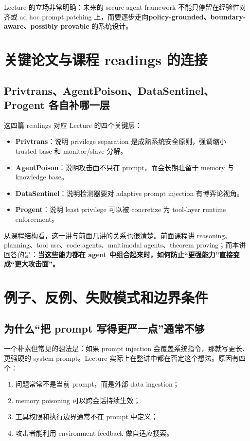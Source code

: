 Lecture 的立场非常明确：未来的 secure agent framework 不能只停留在经验性对齐或 ad hoc prompt patching 上，而要逐步走向\textbf{policy-grounded、boundary-aware、possibly provable} 的系统设计。

\section{关键论文与课程 readings 的连接}

\subsection{Privtrans、AgentPoison、DataSentinel、Progent 各自补哪一层}

这四篇 readings 对应 Lecture 的四个关键层：

\begin{itemize}
\item \textbf{Privtrans}：说明 privilege separation 是成熟系统安全原则，强调缩小 trusted base 和 monitor/slave 分解。
\item \textbf{AgentPoison}：说明攻击面不只在 prompt，而会长期驻留于 memory 与 knowledge base。
\item \textbf{DataSentinel}：说明检测器要对 adaptive prompt injection 有博弈论视角。
\item \textbf{Progent}：说明 least privilege 可以被 concretize 为 tool-layer runtime enforcement。
\end{itemize}

从课程结构看，这一讲与前面几讲的关系也很清楚。前面课程讲 reasoning、planning、tool use、code agents、multimodal agents、theorem proving；而本讲回答的是：\textbf{当这些能力都在 agent 中组合起来时，如何防止“更强能力”直接变成“更大攻击面”。}

\section{例子、反例、失败模式和边界条件}

\subsection{为什么“把 prompt 写得更严一点”通常不够}

一个朴素但常见的想法是：如果 prompt injection 会覆盖系统指令，那就写更长、更强硬的 system prompt。Lecture 实际上在整讲中都在否定这个想法。原因有四个：

\begin{enumerate}
\item 问题常常不是当前 prompt，而是外部 data ingestion；
\item memory poisoning 可以跨会话持续生效；
\item 工具权限和执行边界通常不在 prompt 中定义；
\item 攻击者能利用 environment feedback 做自适应搜索。
\end{enumerate}

